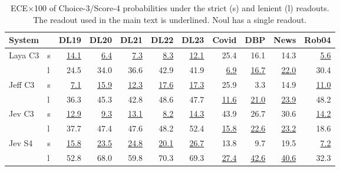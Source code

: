 \begin{table}[tp]
\centering
\scriptsize
\setlength{\tabcolsep}{2.2pt}
\caption{ECE$\times$100 of Choice-3/Score-4 probabilities under the strict (s) and lenient (l) readouts. The readout used in the main text is underlined. Noul has a single readout.}
\label{tab:readouts}
\begin{tabular}{llrrrrrrrrr}
\toprule
System & & DL19 & DL20 & DL21 & DL22 & DL23 & Covid & DBP & News & Rob04 \\
\midrule
Laya C3 & s & \underline{14.1} & \underline{6.4} & \underline{7.3} & \underline{8.3} & \underline{12.1} & 25.4 & 16.1 & 14.3 & \underline{5.6} \\
 & l & 24.5 & 34.0 & 36.6 & 42.9 & 41.9 & \underline{6.9} & \underline{16.7} & \underline{22.0} & 30.4 \\
Jeff C3 & s & \underline{7.1} & \underline{15.9} & \underline{12.3} & \underline{17.6} & \underline{17.3} & 25.9 & 3.3 & 14.9 & \underline{11.0} \\
 & l & 36.3 & 45.3 & 42.8 & 48.6 & 47.7 & \underline{11.6} & \underline{21.0} & \underline{23.9} & 48.2 \\
Jev C3 & s & \underline{12.9} & \underline{9.3} & \underline{13.1} & \underline{8.2} & \underline{14.3} & 43.9 & 26.7 & 30.6 & \underline{14.2} \\
 & l & 37.7 & 47.4 & 47.6 & 48.2 & 52.4 & \underline{15.8} & \underline{22.6} & \underline{23.2} & 18.6 \\
Jev S4 & s & \underline{15.8} & \underline{23.5} & \underline{24.8} & \underline{20.1} & \underline{26.7} & 13.8 & 9.7 & 19.5 & \underline{7.2} \\
 & l & 52.8 & 68.0 & 59.8 & 70.3 & 69.3 & \underline{27.4} & \underline{42.6} & \underline{40.6} & 32.3 \\
\bottomrule
\end{tabular}
\end{table}